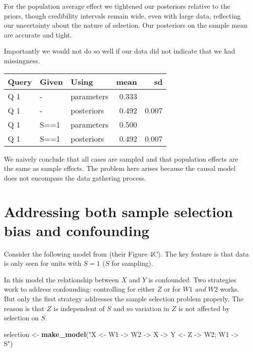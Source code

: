 \documentclass[
  12pt,
]{book}
\newenvironment{Shaded}{\begin{snugshade}}{\end{snugshade}}
\newcommand{\KeywordTok}[1]{\textcolor[rgb]{0.13,0.29,0.53}{\textbf{#1}}}
\newcommand{\NormalTok}[1]{#1}
\newcommand{\StringTok}[1]{\textcolor[rgb]{0.31,0.60,0.02}{#1}}
\begin{document}
For the population average effect we tightened our posteriors relative to the priors, though credibility intervals remain wide, even with large data, reflecting our uncertainty about the nature of selection. Our posteriors on the sample mean are accurate and tight.

Importantly we would not do so well if our data did not indicate that we had missingness.

\begin{tabular}{l|l|l|r|r}
\hline
Query & Given & Using & mean & sd\\
\hline
Q 1 & - & parameters & 0.333 & \\
\hline
Q 1 & - & posteriors & 0.492 & 0.007\\
\hline
Q 1 & S==1 & parameters & 0.500 & \\
\hline
Q 1 & S==1 & posteriors & 0.492 & 0.007\\
\hline
\end{tabular}

We naively conclude that all cases are sampled and that population effects are the same as sample effects. The problem here arises because the causal model does not encompass the data gathering process.

\hypertarget{addressing-both-sample-selection-bias-and-confounding}{%
\section{Addressing both sample selection bias and confounding}\label{addressing-both-sample-selection-bias-and-confounding}}

Consider the following model from \citet{bareinboim2016causal} (their Figure 4C). The key feature is that data is only seen for units with \(S=1\) (\(S\) for sampling).

In this model the relationship between \(X\) and \(Y\) is confounded. Two strategies work to address confounding: controlling for either \(Z\) or for \(W1\) \emph{and} \(W2\) works. But only the first strategy addresses the sample selection problem properly. The reason is that \(Z\) is independent of \(S\) and so variation in \(Z\) is not affected by selection on \(S\).

\begin{Shaded}
\begin{Highlighting}[]
\NormalTok{selection <-}\StringTok{ }\KeywordTok{make_model}\NormalTok{(}\StringTok{"X <- W1 -> W2 -> X -> Y <- Z -> W2; W1 -> S"}\NormalTok{)}
\end{Highlighting}
\end{Shaded}
\end{document}
